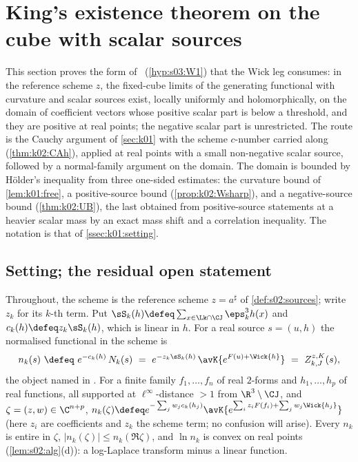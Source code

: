 \section{King's existence theorem on the cube with scalar sources}\label{sec:k02}

This section proves the form of \Wone\ (\cref{hyp:s03:W1}) that the Wick leg consumes: in the reference scheme $z$, the fixed-cube limits of the generating functional with curvature and scalar sources exist, locally uniformly and holomorphically, on the domain of coefficient vectors whose positive scalar part is below a threshold, and they are positive at real points; the negative scalar part is unrestricted. The route is the Cauchy argument of \cref{sec:k01} with the scheme $c$-number carried along (\cref{thm:k02:CAh}), applied at real points with a small non-negative scalar source, followed by a normal-family argument on the domain. The domain is bounded by Hölder's inequality from three one-sided estimates: the curvature bound of \cref{lem:k01:free}, a positive-source bound (\cref{prop:k02:Wsharp}), and a negative-source bound (\cref{thm:k02:UB}), the last obtained from positive-source statements at a heavier scalar mass by an exact mass shift and a correlation inequality. The notation is that of \cref{ssec:k01:setting}.

\subsection{Setting; the residual open statement}\label{ssec:k02:setting}

Throughout, the scheme is the reference scheme $z=a^\sharp$ of \cref{def:s02:sources}; write $z_k$ for its $k$-th term. Put $\sS_k(h)\defeq\sum_{x\in\Lk\cap\CJ}\eps_k^3h(x)$ and $c_k(h)\defeq z_k\sS_k(h)$, which is linear in $h$. For a real source $s=(u,h)$ the normalised functional in the scheme is
\[
n_k(s)\ \defeq\ e^{-c_k(h)}\,N_k(s)\ =\ e^{-z_k\sS_k(h)}\,\avK{e^{F(u)+\Wick{h}}}\ =\ Z^{z,K}_{k,J}(s),
\]
the object named in \Wone. For a finite family $f_1,\dots,f_n$ of real $2$-forms and $h_1,\dots,h_p$ of real functions, all supported at $\ell^\infty$-distance $>1$ from $\R^3\setminus\CJ$, and $\zeta=(z,w)\in\C^{n+p}$, $n_k(\zeta)\defeq e^{-\sum_jw_jc_k(h_j)}\avK{e^{\sum_iz_iF(f_i)+\sum_jw_j\Wick{h_j}}}$ (here $z_i$ are coefficients and $z_k$ the scheme term; no confusion will arise). Every $n_k$ is entire in $\zeta$, $|n_k(\zeta)|\le n_k(\Re\zeta)$, and $\ln n_k$ is convex on real points (\cref{lem:s02:alg}(d)): a log-Laplace transform minus a linear function.

